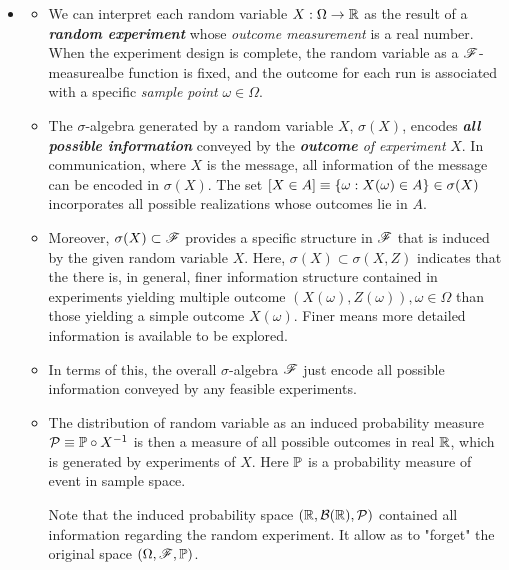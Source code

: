 \documentclass[11pt]{article}
\begin{document}
\begin{itemize}
\item \begin{remark} \citep{billingsley2008probability}
\begin{itemize}
\item We can interpret each random variable $X: \Omega \rightarrow {\mathbb R}$ as the result of a \emph{\textbf{random experiment}} whose \emph{outcome measurement} is a real number. %
When the experiment design is complete, the random variable as a ${\mathscr F}$-measurealbe function is fixed, and the outcome for each run is associated with a specific \emph{sample point} $\omega\in \Omega$.

\item The $\sigma$-algebra generated by a random variable $X$, $\sigma(X)$, encodes \emph{\textbf{all possible information}} conveyed by the \emph{\textbf{outcome} of experiment} $X$.  In communication, where $X$ is the message, all information of the message can be encoded in $\sigma(X)$.  %
The set $\left[X\in A\right]\equiv \left\{\omega: X(\omega)\in A\right\}\in \sigma(X)$ incorporates all possible realizations whose outcomes lie in $A$. 

\item Moreover,  $\sigma(X)\subset {\mathscr F}$ provides a specific structure in ${\mathscr F}$ that is induced by the given random variable $X$.  Here, $\sigma(X) \subset \sigma(X,Z)$ indicates that the there is, in general, finer information structure contained in experiments yielding multiple outcome $(X(\omega),Z(\omega)), \omega\in \Omega$ than those yielding a simple outcome $X(\omega)$. Finer means more detailed information is available to be explored. %

\item In terms of this, the overall $\sigma$-algebra ${\mathscr F}$ just encode all possible information conveyed by any feasible experiments.

\item The distribution of random variable as an induced probability measure ${\mathcal P} \equiv {\mathbb P}\circ X^{-1}$ is then a measure of all possible outcomes in real ${\mathbb R}$, which is generated by experiments of $X$. Here ${\mathbb P}$ is a probability measure of event in sample space. 

Note that the induced probability space $({\mathbb R}, {\mathcal B}({\mathbb R}), {\mathcal P})$ contained all information regarding the random experiment. It allow as to "forget" the original space $(\Omega, {\mathscr F}, {\mathbb P})$.


\end{itemize}
\end{remark}
\end{itemize}
\end{document}
